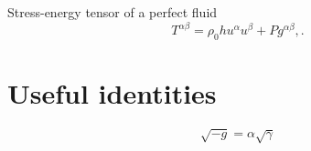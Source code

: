\documentclass[]{scrartcl}
\begin{document}
Stress-energy tensor of a perfect fluid
\begin{equation}
  \label{eq:8}
  T^{\alpha\beta} = \rho_0 h u^\alpha u^\beta + P g^{\alpha\beta},.
\end{equation}

\section{Useful identities}
\label{sec:useful-identities}

\begin{equation}
  \label{eq:3}
  \sqrt{-g} = \alpha \sqrt{\gamma}
\end{equation}
\end{document}

